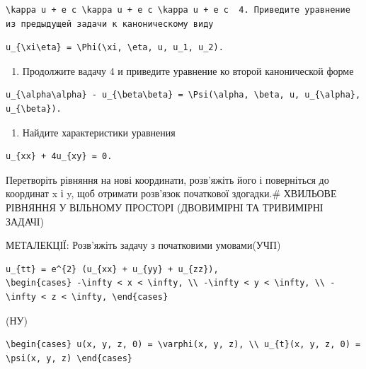 \documentclass[
  ukrainian,
]{article}
\providecommand{\tightlist}{%
  \setlength{\itemsep}{0pt}\setlength{\parskip}{0pt}}
\begin{document}
\begin{verbatim}
\kappa u + e c \kappa u + e c \kappa u + e c  4. Приведите уравнение из предыдущей задачи к каноническому виду
\end{verbatim}

\begin{verbatim}
u_{\xi\eta} = \Phi(\xi, \eta, u, u_1, u_2).
\end{verbatim}

\begin{enumerate}
\def\labelenumi{\arabic{enumi}.}
\setcounter{enumi}{4}
\tightlist
\item
  Продолжите вадачу 4 и приведите уравнение ко второй канонической форме
\end{enumerate}

\begin{verbatim}
u_{\alpha\alpha} - u_{\beta\beta} = \Psi(\alpha, \beta, u, u_{\alpha}, u_{\beta}).
\end{verbatim}

\begin{enumerate}
\def\labelenumi{\arabic{enumi}.}
\setcounter{enumi}{5}
\tightlist
\item
  Найдите характеристики уравнения
\end{enumerate}

\begin{verbatim}
u_{xx} + 4u_{xy} = 0.
\end{verbatim}

Перетворіть рівняння на нові координати, розв'яжіть його і поверніться
до координат x і y, щоб отримати розв'язок початкової здогадки.\#
ХВИЛЬОВЕ РІВНЯННЯ У ВІЛЬНОМУ ПРОСТОРІ (ДВОВИМІРНІ ТА ТРИВИМІРНІ ЗАДАЧІ)

МЕТАЛЕКЦІЇ: Розв'яжіть задачу з початковими умовами(УЧП)

\begin{verbatim}
u_{tt} = e^{2} (u_{xx} + u_{yy} + u_{zz}),
\begin{cases} -\infty < x < \infty, \\ -\infty < y < \infty, \\ -\infty < z < \infty, \end{cases}
\end{verbatim}

(НУ)

\begin{verbatim}
\begin{cases} u(x, y, z, 0) = \varphi(x, y, z), \\ u_{t}(x, y, z, 0) = \psi(x, y, z) \end{cases}
\end{verbatim}
\end{document}
